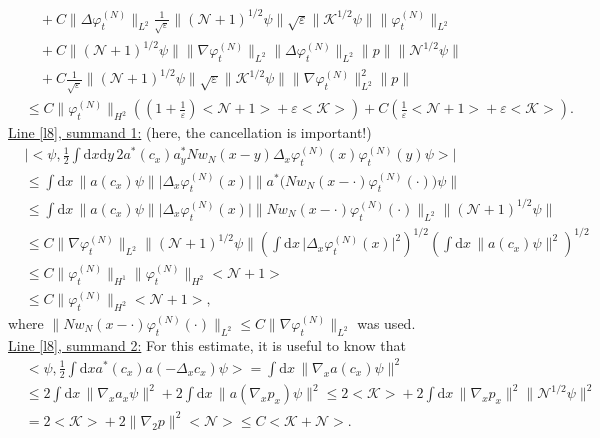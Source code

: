 \documentclass[11pt,a4paper,draft,DIV11]{scrartcl}	%
\newcommand{\di}{\textrm{d}}		%
\newcommand{\Ncal}{\mathcal{N}}		%
\newcommand{\Kcal}{\mathcal{K}}		%
\newcommand{\estlist}[2]{\underline{Line \ref{l#1}, summand #2:}}
\newcommand{\scal}[2]{\big<#1,#2\big>} %
\newcommand{\norm}[1]{\lVert#1\rVert}	%
\newcommand{\ev}[1]{\big<#1\big>}	%
\newcommand{\ph}{\varphi_t^{(N)}}	%
\newcommand{\gradone}{\nabla_2}
\begin{document}
\begin{align*}
& \quad + C\norm{\Delta \ph}_{L^2} \frac{1}{\sqrt{\varepsilon}} \norm{(\Ncal+1)^{1/2}\psi}  \sqrt{\varepsilon}\norm{\Kcal^{1/2}\psi} \norm{\ph}_{L^2} \\
& \quad + C \norm{(\Ncal+1)^{1/2}\psi} \norm{\nabla \ph}_{L^2} \norm{\Delta \ph}_{L^2} \norm{p} \norm{\Ncal^{1/2}\psi} \\
& \quad + C \frac{1}{\sqrt{\varepsilon}}\norm{(\Ncal+1)^{1/2}\psi} \sqrt{\varepsilon}\norm{\Kcal^{1/2}\psi} \norm{\nabla \ph}_{L^2}^2 \norm{p} \\
& \leq C \norm{\ph}_{H^2} \left( (1+\frac{1}{\varepsilon})\ev{\Ncal+1} + \varepsilon\ev{\Kcal} \right) + C \left( \frac{1}{\varepsilon}\ev{\Ncal+1} + \varepsilon \ev{\Kcal} \right).
\end{align*}
\estlist{8}{1} (here, the cancellation is important!)
\begin{align*}
&\lvert \scal{\psi}{\frac{1}{2}\int \di x\di y\, 2a^\ast(c_x) a^\ast_y N w_N(x-y) \Delta_x \ph(x) \ph(y) \psi}\rvert\\
& \leq \int \di x\, \norm{a(c_x)\psi} \lvert \Delta_x \ph(x)\rvert \norm{a^\ast\big(Nw_N(x-\cdot)\ph(\cdot)\big)\psi} \\
& \leq \int \di x\, \norm{a(c_x)\psi} \lvert \Delta_x \ph(x)\rvert \norm{N w_N(x-\cdot)\ph(\cdot)}_{L^2} \norm{(\Ncal+1)^{1/2}\psi} \\
& \leq C \norm{\nabla\ph}_{L^2} \norm{(\Ncal+1)^{1/2} \psi} \left( \int \di x\, \lvert \Delta_x \ph(x)\rvert^2 \right)^{1/2} \left( \int \di x\, \norm{a(c_x)\psi}^2 \right)^{1/2} \\
& \leq C \norm{\ph}_{H^1} \norm{\ph}_{H^2} \ev{\Ncal+1} \\
& \leq C \norm{\ph}_{H^2} \ev{\Ncal+1},
\end{align*}
where $\norm{Nw_N(x-\cdot)\ph(\cdot)}_{L^2} \leq C\norm{\nabla \ph}_{L^2}$ was used.\\
\estlist{8}{2}
For this estimate, it is useful to know that
\begin{equation} \label{eq:bound1B}                                     
\begin{split}
 & \scal{\psi}{\frac{1}{2}\int \di x a^\ast(c_x) a(-\Delta_x c_x)\psi} = \int \di x\, \norm{\nabla_x a(c_x)\psi}^2 \\
 & \leq 2 \int \di x\, \norm{\nabla_x a_x \psi}^2 + 2\int \di x\, \norm{a(\nabla_x p_x)\psi}^2 \leq 2\ev{\Kcal} + 2\int \di x\, \norm{\nabla_x p_x}^2 \norm{\Ncal^{1/2}\psi}^2 \\
 & = 2\ev{\Kcal}+ 2\norm{\gradone p}^2 \ev{\Ncal} \leq C\ev{\Kcal + \Ncal}.
\end{split}
\end{equation}
\end{document}
